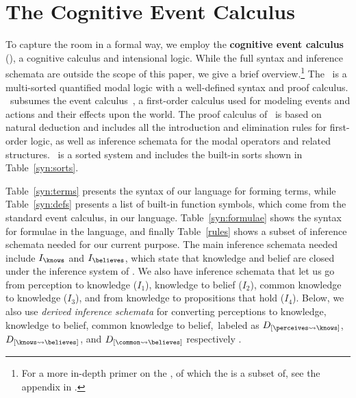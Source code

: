 \section{The Cognitive Event Calculus}

To capture the room in a formal way, we employ the
\textbf{cognitive event calculus} (\CEC), a cognitive calculus and
intensional logic.  While the full syntax
and inference schemata are outside the scope of this paper, we give a
brief overview.\footnote{For a more in-depth primer on the \DCEC, of which the \CEC is a subset of,
see the appendix in \cite{nsg_sb_dde_ijcai}.} The \CEC\ is a multi-sorted
quantified modal logic with a well-defined syntax and proof calculus.
\CEC\ subsumes the event calculus~\cite{mueller_commonsense_2014}, a first-order
calculus used for modeling events and actions and their effects upon
the world.  The proof calculus of \CEC\ is based on natural deduction
\cite{gentzen_investigations_1964} and includes all the introduction and elimination
rules for first-order logic, as well as inference schemata for the
modal operators and related structures.  \CEC\ is a sorted system and
includes the built-in sorts shown in Table~\ref{syn:sorts}.

Table~\ref{syn:terms} presents the syntax of our language for forming
terms, while Table~\ref{syn:defs} presents a list of built-in function
symbols, which come from the standard event calculus, in our language.
Table~\ref{syn:formulae} shows the syntax for
formulae in the language, and finally Table~\ref{rules} shows a subset of
inference schemata needed for our current purpose. The main
inference schemata needed include $I_{\knows}$ and $I_{\believes}$,
which state that knowledge and belief are closed under the inference
system of \CEC.  We also have inference schemata that let us go
from perception to knowledge ($I_1$), knowledge to belief ($I_2$),
common knowledge to knowledge ($I_3$), and from knowledge to
propositions that hold ($I_4$). Below, we also use \emph{derived
  inference schemata} for converting perceptions to knowledge,
knowledge to belief, common knowledge to belief,~labeled as
$D_{[\perceives \leadsto \knows]}$, $D_{[\knows \leadsto \believes]}$,
and $D_{[\common \leadsto \believes]}$ respectively
\cite{ArkoudasAndBringsjord2008Pricai}.

